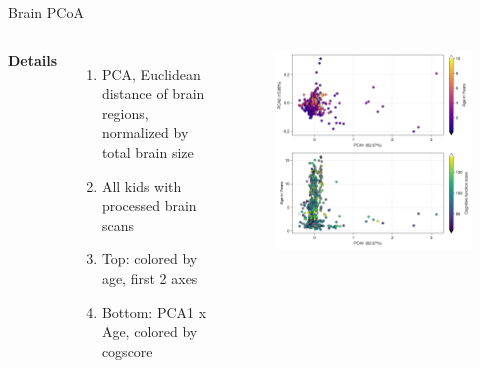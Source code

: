 
\begin{frame}{Brain PCoA}
    \begin{columns}[c] %

        \textbf{Details}
        \begin{enumerate}
            \item PCA, Euclidean distance of brain regions, normalized by total brain size
            \item All kids with processed brain scans
            \item Top: colored by age, first 2 axes
            \item Bottom: PCA1 x Age, colored by cogscore
            
        \end{enumerate}

    
        \begin{figure}
        \includegraphics[width=1\linewidth]{../figures/brain_pcoa.png}
        \end{figure}

    \end{columns}
\end{frame}

